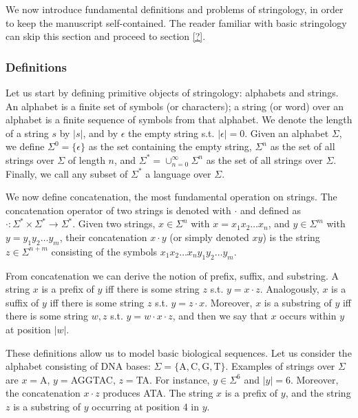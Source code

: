 We now introduce fundamental definitions and problems of stringology, in order to keep the manuscript self-contained.
The reader familiar with basic stringology can skip this section and proceed to section \ref{?}.

\subsubsection{Definitions}

Let us start by defining primitive objects of stringology: alphabets and strings.
An alphabet is a finite set of symbols (or characters); a string (or word) over an alphabet is a finite sequence of symbols from that alphabet.
We denote the length of a string $s$ by $| s |$, and by $\epsilon$ the empty string s.t. $| \epsilon |=0$.
Given an alphabet $\Sigma$, we define $\Sigma^0=\{ \epsilon \}$ as the set containing the empty string, $\Sigma^n$ as the set of all strings over $\Sigma$ of length $n$, and $\Sigma^* = \cup_{n=0}^{\infty}{\Sigma^n}$ as the set of all strings over $\Sigma$.
Finally, we call any subset of $\Sigma^*$ a language over $\Sigma$.

We now define concatenation, the most fundamental operation on strings.
The concatenation operator of two strings is denoted with $\cdot$ and defined as $\cdot : \Sigma^* \times \Sigma^* \rightarrow \Sigma^*$.
Given two strings, $x \in \Sigma^n$ with $x=x_1 x_2 \dots x_n$, and $y \in \Sigma^m$ with $y=y_1 y_2 \dots y_m$, their concatenation $x \cdot y$ (or simply denoted $xy$) is the string $z \in \Sigma^{n+m}$ consisting of the symbols $x_1 x_2 \dots x_n y_1 y_2 \dots y_m$.

From concatenation we can derive the notion of prefix, suffix, and substring.
A string $x$ is a prefix of $y$ iff there is some string $z$ s.t. $y=x\cdot z$.
Analogously, $x$ is a suffix of $y$ iff there is some string $z$ s.t. $y=z\cdot x$.
Moreover, $x$ is a substring of $y$ iff there is some string $w,z$ s.t. $y=w\cdot x \cdot z$, and then we say that $x$ occurs within $y$ at position $|w|$.

\begin{example}
These definitions allow us to model basic biological sequences.
Let us consider the alphabet consisting of DNA bases: $\Sigma = \{\text{A},\text{C},\text{G},\text{T}\}$.
Examples of strings over $\Sigma$ are $x=$A, $y=$AGGTAC, $z=$TA.
For instance, $y \in \Sigma^6$ and $| y | = 6$.
Moreover, the concatenation $x \cdot z$ produces ATA.
The string $x$ is a prefix of $y$, and the string $z$ is a substring of $y$  occurring at position 4 in $y$.
\end{example}

